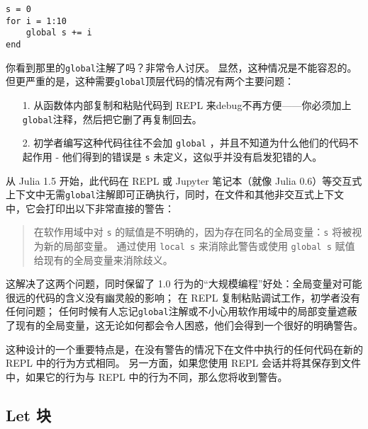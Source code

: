 \begin{verbatim}
s = 0
for i = 1:10
    global s += i
end
\end{verbatim}



你看到那里的\texttt{global}注解了吗？非常令人讨厌。 显然，这种情况是不能容忍的。但更严重的是，这种需要\texttt{global}顶层代码的情况有两个主要问题：



\begin{itemize}
\item[1. ] 从函数体内部复制和粘贴代码到 REPL 来debug不再方便——你必须加上\texttt{global}注释，然后把它删了再复制回去。


\item[2. ] 初学者编写这种代码往往不会加 \texttt{global} ，并且不知道为什么他们的代码不起作用 - 他们得到的错误是 \texttt{s} 未定义，这似乎并没有启发犯错的人。

\end{itemize}


从 Julia 1.5 开始，此代码在 REPL 或 Jupyter 笔记本（就像 Julia 0.6）等交互式上下文中无需\texttt{global}注解即可正确执行，同时，在文件和其他非交互式上下文中，它会打印出以下非常直接的警告：



\begin{quote}
在软作用域中对 \texttt{s} 的赋值是不明确的，因为存在同名的全局变量：\texttt{s} 将被视为新的局部变量。 通过使用 \texttt{local s} 来消除此警告或使用 \texttt{global s} 赋值给现有的全局变量来消除歧义。

\end{quote}


这解决了这两个问题，同时保留了 1.0 行为的“大规模编程”好处：全局变量对可能很远的代码的含义没有幽灵般的影响； 在 REPL 复制粘贴调试工作，初学者没有任何问题； 任何时候有人忘记\texttt{global}注解或不小心用软作用域中的局部变量遮蔽了现有的全局变量，这无论如何都会令人困惑，他们会得到一个很好的明确警告。



这种设计的一个重要特点是，在没有警告的情况下在文件中执行的任何代码在新的 REPL 中的行为方式相同。 另一方面，如果您使用 REPL 会话并将其保存到文件中，如果它的行为与 REPL 中的行为不同，那么您将收到警告。



\hypertarget{10497572111867317266}{}


\subsection{Let 块}



